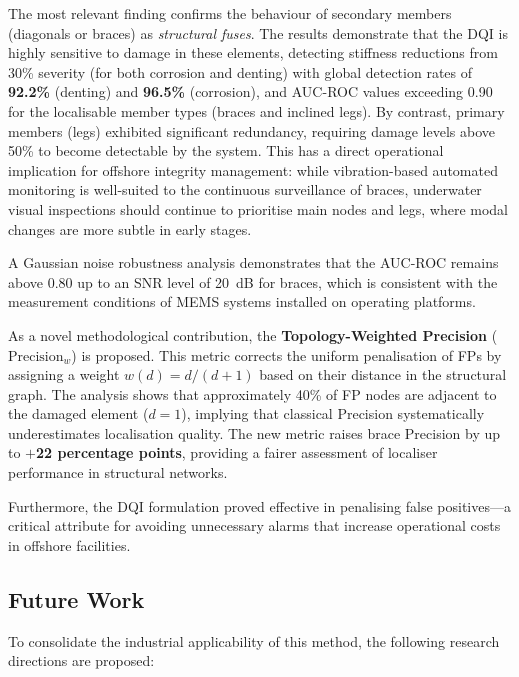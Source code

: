 \documentclass[preprint,12pt]{elsarticle}
\begin{document}
The most relevant finding confirms the behaviour of secondary members (diagonals or braces) as \emph{structural fuses}. The results demonstrate that the DQI is highly sensitive to damage in these elements, detecting stiffness reductions from 30\% severity (for both corrosion and denting) with global detection rates of \textbf{92.2\%} (denting) and \textbf{96.5\%} (corrosion), and AUC-ROC values exceeding 0.90 for the localisable member types (braces and inclined legs). By contrast, primary members (legs) exhibited significant redundancy, requiring damage levels above 50\% to become detectable by the system. This has a direct operational implication for offshore integrity management: while vibration-based automated monitoring is well-suited to the continuous surveillance of braces, underwater visual inspections should continue to prioritise main nodes and legs, where modal changes are more subtle in early stages.

A Gaussian noise robustness analysis demonstrates that the AUC-ROC remains above 0.80 up to an SNR level of 20~dB for braces, which is consistent with the measurement conditions of MEMS systems installed on operating platforms.

As a novel methodological contribution, the \textbf{Topology-Weighted Precision} ($\text{Precision}_w$) is proposed. This metric corrects the uniform penalisation of FPs by assigning a weight $w(d) = d/(d+1)$ based on their distance in the structural graph. The analysis shows that approximately 40\% of FP nodes are adjacent to the damaged element ($d = 1$), implying that classical Precision systematically underestimates localisation quality. The new metric raises brace Precision by up to \textbf{$+$22 percentage points}, providing a fairer assessment of localiser performance in structural networks.

Furthermore, the DQI formulation proved effective in penalising false positives---a critical attribute for avoiding unnecessary alarms that increase operational costs in offshore facilities.

\subsection{Future Work}

To consolidate the industrial applicability of this method, the following research directions are proposed:
\end{document}
